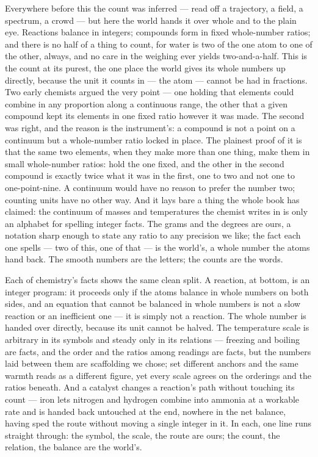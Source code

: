 Everywhere before this the count was inferred --- read off a trajectory, a field, a spectrum, a crowd --- but
here the world hands it over whole and to the plain eye. Reactions balance in integers; compounds form in fixed
whole-number ratios; and there is no half of a thing to count, for water is two of the one atom to one of the
other, always, and no care in the weighing ever yields two-and-a-half. This is the count at its purest, the one
place the world gives its whole numbers up directly, because the unit it counts in --- the atom --- cannot be
had in fractions. Two early chemists argued the very point --- one holding that elements could combine in any
proportion along a continuous range, the other that a given compound kept its elements in one fixed ratio
however it was made. The second was right, and the reason is the instrument's: a compound is not a point on a
continuum but a whole-number ratio locked in place. The plainest proof of it is that the same two elements, when they make more than one thing,
make them in small whole-number ratios: hold the one fixed, and the other in the second compound is exactly
twice what it was in the first, one to two and not one to one-point-nine. A continuum would have no reason to
prefer the number two; counting units have no other way. And it lays bare a thing the whole book has claimed: the continuum of masses and temperatures
the chemist writes in is only an alphabet for spelling integer facts. The grams and the degrees are ours, a
notation sharp enough to state any ratio to any precision we like; the fact each one spells --- two of this, one
of that --- is the world's, a whole number the atoms hand back. The smooth numbers are the letters; the counts
are the words.

Each of chemistry's facts shows the same clean split. A reaction, at bottom, is an integer program: it proceeds
only if the atoms balance in whole numbers on both sides, and an equation that cannot be balanced in whole
numbers is not a slow reaction or an inefficient one --- it is simply not a reaction. The whole number is handed
over directly, because its unit cannot be halved. The temperature scale is arbitrary in its symbols and steady
only in its relations --- freezing and boiling are facts, and the order and the ratios among readings are facts,
but the numbers laid between them are scaffolding we chose; set different anchors and the same warmth reads as a
different figure, yet every scale agrees on the orderings and the ratios beneath. And a catalyst changes a
reaction's path without touching its count --- iron lets nitrogen and hydrogen combine into ammonia at a
workable rate and is handed back untouched at the end, nowhere in the net balance, having sped the route without
moving a single integer in it. In each, one line runs straight through: the symbol, the scale, the route are
ours; the count, the relation, the balance are the world's.

